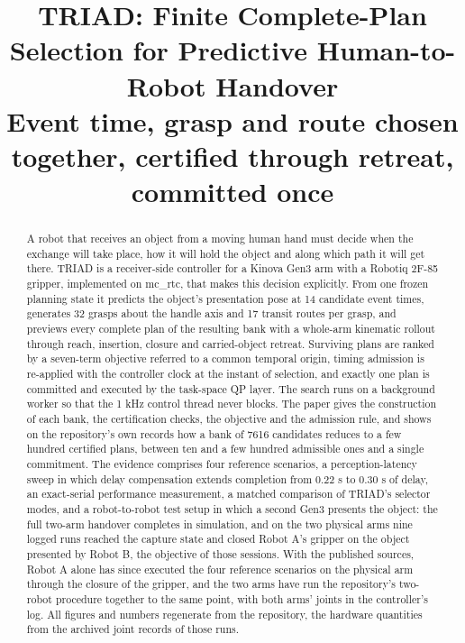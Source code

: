 \documentclass[conference]{IEEEtran}
\begin{document}
\title{TRIAD: Finite Complete-Plan Selection for Predictive Human-to-Robot Handover\\
\large Event time, grasp and route chosen together, certified through retreat, committed once}

\author{
}

\maketitle

\begin{abstract}
A robot that receives an object from a moving human hand must decide when the exchange will take place, how it will hold the object and along which path it will get there. TRIAD is a receiver-side controller for a Kinova Gen3 arm with a Robotiq 2F-85 gripper, implemented on mc\_rtc, that makes this decision explicitly. From one frozen planning state it predicts the object's presentation pose at 14 candidate event times, generates 32 grasps about the handle axis and 17 transit routes per grasp, and previews every complete plan of the resulting bank with a whole-arm kinematic rollout through reach, insertion, closure and carried-object retreat. Surviving plans are ranked by a seven-term objective referred to a common temporal origin, timing admission is re-applied with the controller clock at the instant of selection, and exactly one plan is committed and executed by the task-space QP layer. The search runs on a background worker so that the 1 kHz control thread never blocks. The paper gives the construction of each bank, the certification checks, the objective and the admission rule, and shows on the repository's own records how a bank of 7616 candidates reduces to a few hundred certified plans, between ten and a few hundred admissible ones and a single commitment. The evidence comprises four reference scenarios, a perception-latency sweep in which delay compensation extends completion from 0.22 s to 0.30 s of delay, an exact-serial performance measurement, a matched comparison of TRIAD's selector modes, and a robot-to-robot test setup in which a second Gen3 presents the object: the full two-arm handover completes in simulation, and on the two physical arms nine logged runs reached the capture state and closed Robot A's gripper on the object presented by Robot B, the objective of those sessions. With the published sources, Robot A alone has since executed the four reference scenarios on the physical arm through the closure of the gripper, and the two arms have run the repository's two-robot procedure together to the same point, with both arms' joints in the controller's log. All figures and numbers regenerate from the repository, the hardware quantities from the archived joint records of those runs.
\end{abstract}
\end{document}

